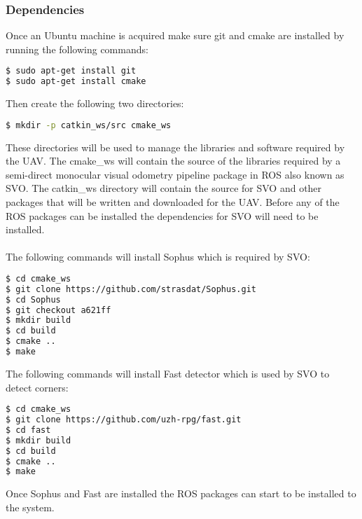 \subsubsection{Dependencies}
Once an Ubuntu machine is acquired make sure git and cmake are installed by running the following commands: 
\begin{lstlisting}[language=bash]
$ sudo apt-get install git
$ sudo apt-get install cmake
\end{lstlisting}
Then create the following two directories:
\begin{lstlisting}[language=bash]
$ mkdir -p catkin_ws/src cmake_ws
\end{lstlisting}
These directories will be used to manage the libraries and software required by the UAV. The cmake\_ws will contain the source of the libraries required by a semi-direct monocular visual odometry pipeline package in ROS also known as SVO. The catkin\_ws directory will contain the source for SVO and other packages that will be written and downloaded for the UAV. Before any of the ROS packages can be installed the dependencies for SVO will need to be installed. \\
\\
The following commands will install Sophus which is required by SVO:
\begin{lstlisting}[language=bash]
$ cd cmake_ws
$ git clone https://github.com/strasdat/Sophus.git
$ cd Sophus
$ git checkout a621ff
$ mkdir build
$ cd build
$ cmake ..
$ make
\end{lstlisting}
The following commands will install Fast detector which is used by SVO to detect corners:
\begin{lstlisting}[language=bash]
$ cd cmake_ws
$ git clone https://github.com/uzh-rpg/fast.git
$ cd fast
$ mkdir build
$ cd build
$ cmake ..
$ make
\end{lstlisting}
Once Sophus and Fast are installed the ROS packages can start to be installed to the system.

